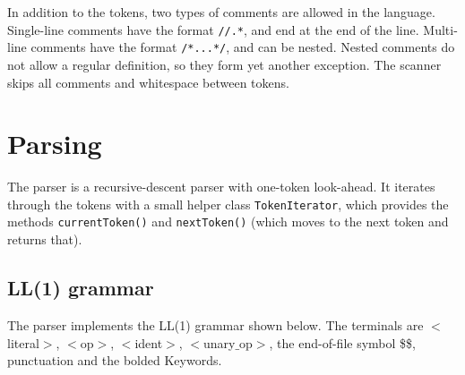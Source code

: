 \documentclass[a4paper]{article}
\newcommand*{\code}[1]{\texttt{#1}}
\begin{document}
In addition to the tokens, two types of comments are allowed in 
the language. Single-line comments have the format \verb_//.*_, 
and end at the end of the line. Multi-line comments have the format
\verb_/*...*/_, and can be nested. Nested comments do not allow 
a regular definition, so they form yet another exception. The 
scanner skips all comments and whitespace between tokens.



\section{Parsing}

The parser is a recursive-descent parser with one-token look-ahead.
It iterates through the tokens with a small helper class 
\code{TokenIterator}, which provides the methods \code{currentToken()} 
and \code{nextToken()} (which moves to the next token and returns that).

\subsection{LL(1) grammar}


\newcommand{\cfgvar}[1]{$<$#1$>$}
\newcommand{\cfgrule}[2]{\text{\cfgvar{#1}} &\rightarrow \text{#2}}
\newcommand{\cfgterm}[1]{\textbf{#1}}
The parser implements the LL(1) grammar shown below.
The terminals are \cfgvar{literal}, \cfgvar{op}, \cfgvar{ident}, 
\cfgvar{unary$\_$op}, the end-of-file symbol \$\$, punctuation 
and the bolded Keywords.
\end{document}
